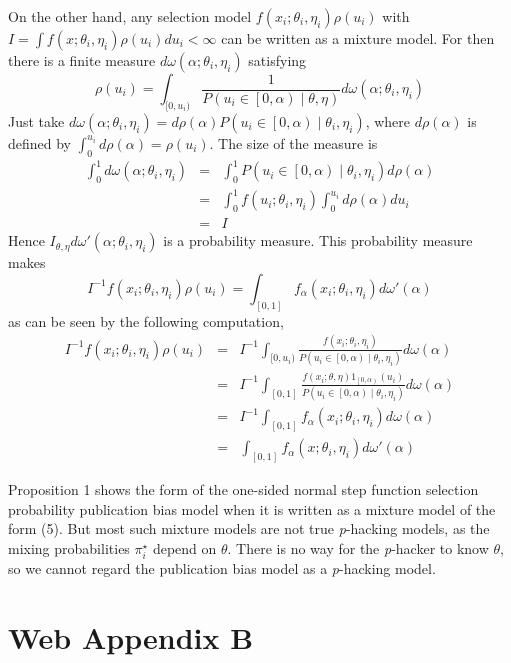 \documentclass[english]{article}
\begin{document}
On the other hand, any selection model $f(x_{i};\theta_{i},\eta_{i})\rho(u_i)$ with $I =\int f(x;\theta_{i},\eta_{i})\rho(u_i)du_i<\infty$ can be written as a mixture model. For then there is a finite measure $d\omega(\alpha;\theta_{i},\eta_{i})$ satisfying 
\[
\rho(u_i)=\int_{[0,u_i)}\frac{1}{P(u_i\in\left[0,\alpha\right)\mid\theta,\eta)}d\omega(\alpha;\theta_{i},\eta_{i})
\]
Just take $d\omega(\alpha;\theta_{i},\eta_{i})=d\rho(\alpha)P(u_i\in\left[0,\alpha\right)\mid\theta_{i},\eta_{i})$, where $d\rho(\alpha)$ is defined by $\int_{0}^{u_i}d\rho(\alpha)=\rho(u_i)$. The size of the measure is
\begin{eqnarray*}
\int_{0}^{1}d\omega(\alpha;\theta_{i},\eta_{i}) & = & \int_{0}^{1}P(u_i\in\left[0,\alpha\right)\mid\theta_{i},\eta_{i})d\rho(\alpha)\\
 & = & \int_{0}^{1}f(u_i;\theta_{i},\eta_{i})\int_{0}^{u_i}d\rho(\alpha)du_i\\
 & = & I
\end{eqnarray*}
Hence $I_{\theta,\eta}d\omega'(\alpha;\theta_{i},\eta_{i})$ is a probability measure. This probability measure makes 
\[
I^{-1}f(x_{i};\theta_{i},\eta_{i})\rho(u_i)=\int_{[0,1]}f_\alpha(x_{i};\theta_{i},\eta_{i})d\omega'(\alpha)
\]
as can be seen by the following computation,
\begin{eqnarray*}
I^{-1}f(x_{i};\theta_{i},\eta_{i})\rho(u_i) & = & I^{-1}\int_{[0,u_i)}\frac{f(x_{i};\theta_{i},\eta_{i})}{P(u_i\in\left[0,\alpha\right)\mid\theta_{i},\eta_{i})}d\omega(\alpha)\\
 & = & I^{-1}\int_{[0,1]}\frac{f(x_{i};\theta,\eta)1_{\left[0,\alpha\right)}(u_i)}{P(u_i\in\left[0,\alpha\right)\mid\theta_{i},\eta_{i})}d\omega(\alpha)\\
 & = & I^{-1}\int_{[0,1]}f_\alpha(x_{i};\theta_{i},\eta_{i})d\omega(\alpha)\\
 & = & \int_{[0,1]}f_\alpha(x;\theta_{i},\eta_{i})d\omega'(\alpha)
\end{eqnarray*}

Proposition 1 shows the form of the one-sided normal step function selection probability publication bias model when it is written as a mixture model of the form (5). But most such mixture models are not true \textit{p}-hacking models, as the mixing probabilities $\pi_{i}^{\star}$ depend on $\theta$. There is no way for the \textit{p}-hacker to know
$\theta$, so we cannot regard the publication bias model as a \textit{p}-hacking model.

\newpage

\section*{Web Appendix B}
\end{document}
